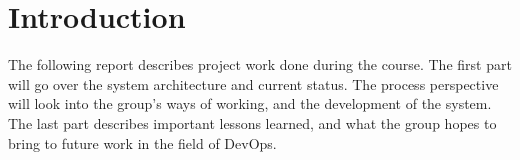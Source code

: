 \section{Introduction}

The following report describes project work done during the course. The first part will go over the system architecture and current status. The process perspective will look into the group's ways of working, and the development of the system. The last part describes important lessons learned, and what the group hopes to bring to future work in the field of DevOps. 